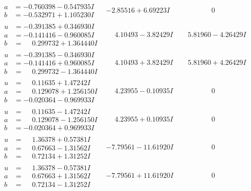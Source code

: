 \documentclass[1p]{elsarticle_modified}
\theoremstyle{definition}
\begin{document}
$$\begin{array}{c|c|c}
\begin{aligned}
a &= -0.760398 - 0.547935 I \\
b &= -0.532971 + 1.105230 I\end{aligned}
 & -2.85516 + 6.69223 I & \phantom{-0.000000 } 0 \\ \hline\begin{aligned}
u &= -0.391385 + 0.346930 I \\
a &= -0.141416 - 0.960085 I \\
b &= \phantom{-}0.299732 + 1.364440 I\end{aligned}
 & \phantom{-}4.10493 - 3.82429 I & \phantom{-}5.81960 - 4.26429 I \\ \hline\begin{aligned}
u &= -0.391385 - 0.346930 I \\
a &= -0.141416 + 0.960085 I \\
b &= \phantom{-}0.299732 - 1.364440 I\end{aligned}
 & \phantom{-}4.10493 + 3.82429 I & \phantom{-}5.81960 + 4.26429 I \\ \hline\begin{aligned}
u &= \phantom{-}0.11635 + 1.47242 I \\
a &= \phantom{-}0.129078 + 1.256150 I \\
b &= -0.020364 - 0.969933 I\end{aligned}
 & \phantom{-}4.23955 - 0.10935 I & \phantom{-0.000000 } 0 \\ \hline\begin{aligned}
u &= \phantom{-}0.11635 - 1.47242 I \\
a &= \phantom{-}0.129078 - 1.256150 I \\
b &= -0.020364 + 0.969933 I\end{aligned}
 & \phantom{-}4.23955 + 0.10935 I & \phantom{-0.000000 } 0 \\ \hline\begin{aligned}
u &= \phantom{-}1.36378 + 0.57381 I \\
a &= \phantom{-}0.67663 - 1.31562 I \\
b &= \phantom{-}0.72134 + 1.31252 I\end{aligned}
 & -7.79561 - 11.61920 I & \phantom{-0.000000 } 0 \\ \hline\begin{aligned}
u &= \phantom{-}1.36378 - 0.57381 I \\
a &= \phantom{-}0.67663 + 1.31562 I \\
b &= \phantom{-}0.72134 - 1.31252 I\end{aligned}
 & -7.79561 + 11.61920 I & \phantom{-0.000000 } 0\\

\end{array}$$
\end{document}
